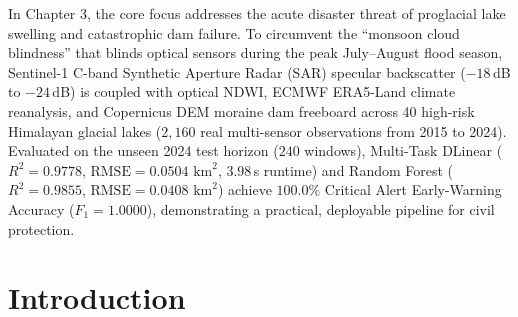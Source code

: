 \documentclass[12pt,a4paper]{report}
\begin{document}
In Chapter 3, the core focus addresses the acute disaster threat of proglacial lake swelling and catastrophic dam failure. To circumvent the ``monsoon cloud blindness'' that blinds optical sensors during the peak July--August flood season, Sentinel-1 C-band Synthetic Aperture Radar (SAR) specular backscatter ($-18$\,dB to $-24$\,dB) is coupled with optical NDWI, ECMWF ERA5-Land climate reanalysis, and Copernicus DEM moraine dam freeboard across 40 high-risk Himalayan glacial lakes ($2,160$ real multi-sensor observations from 2015 to 2024). Evaluated on the unseen 2024 test horizon ($240$ windows), Multi-Task DLinear ($R^2 = 0.9778$, $\text{RMSE} = 0.0504\text{ km}^2$, $3.98$\,s runtime) and Random Forest ($R^2 = 0.9855$, $\text{RMSE} = 0.0408\text{ km}^2$) achieve $100.0\%$ Critical Alert Early-Warning Accuracy ($F_1 = 1.0000$), demonstrating a practical, deployable pipeline for civil protection.

\newpage
\tableofcontents

\newpage
\listoffigures

\newpage
\listoftables

\newpage
{}
\setcounter{page}{1}

\chapter{Introduction}
\end{document}
